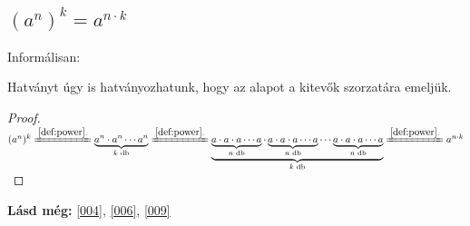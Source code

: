 \subsection{\texorpdfstring{$(a^n)^k = a^{n \cdot k}$}{(a**n)**k = a**(n * k)}}
Informálisan:

Hatványt úgy is hatványozhatunk, hogy az alapot a kitevők szorzatára emeljük.

\begin{proof}

$(a^n)^k
 \xlongequal{\ref{def:power}.}
 \underbrace{a^n \cdot a^n \dotsm a^n}_{k \text{ db}} 
 \xlongequal{\ref{def:power}.}
 \underbrace{\underbrace{a \cdot a \cdot a \dotsm a}_{n \text{ db}}
   \cdot \underbrace{a \cdot a \cdot a \dotsm a}_{n \text{ db}} \dotsm
   \underbrace{a \cdot a \cdot a \dotsm a}_{n \text{ db}}}_{k \text{ db}}
 \xlongequal{\ref{def:power}.} a^{n \cdot k}
$
\end{proof}

\textbf{Lásd még:} \ref{004}, \ref{006}, \ref{009}
